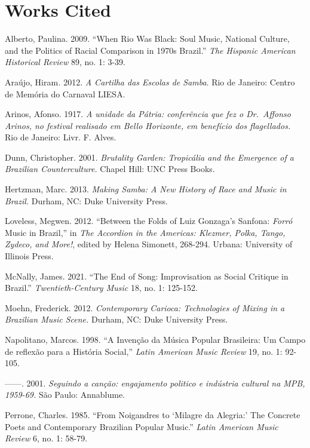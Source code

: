 \documentclass[twoside]{article}
\begin{document}
\hypertarget{works-cited}{%
\section*{Works Cited}\label{works-cited}}

\begin{hangparas}{15pt}{1}

Alberto, Paulina. 2009. ``When Rio Was Black: Soul Music,
National Culture, and the Politics of Racial Comparison in 1970s
Brazil.'' \emph{The Hispanic American Historical Review} 89, no. 1:
3-39.

Araújo, Hiram\emph{.} 2012. \emph{A Cartilha das Escolas de
Samba}. Rio de Janeiro: Centro de Memória do Carnaval LIESA.

Arinos, Afonso. 1917. \emph{A unidade da Pátria: conferência
que fez o Dr.~Affonso Arinos, no festival realisado em Bello Horizonte,
em benefício dos flagellados.} Rio de Janeiro: Livr. F. Alves.

Dunn, Christopher. 2001. \emph{Brutality Garden: Tropicália
and the Emergence of a Brazilian Counterculture.} Chapel Hill: UNC Press
Books.

Hertzman, Marc. 2013. \emph{Making Samba: A New History of
Race and Music in Brazil.} Durham, NC: Duke University Press.

Loveless, Megwen. 2012. ``Between the Folds of Luiz Gonzaga's
Sanfona: \emph{Forró} Music in Brazil,'' in \emph{The Accordion in the
Americas: Klezmer, Polka, Tango, Zydeco, and More!}, edited by Helena
Simonett, 268-294. Urbana: University of Illinois Press.

McNally, James. 2021. ``The End of Song: Improvisation as
Social Critique in Brazil.'' \emph{Twentieth-Century Music} 18, no. 1:
125-152.

Moehn, Frederick. 2012. \emph{Contemporary Carioca:
Technologies of Mixing in a Brazilian Music Scene.} Durham, NC: Duke
University Press.

Napolitano, Marcos. 1998. ``A Invenção da Música Popular
Brasileira: Um Campo de reflexão para a História Social,'' \emph{Latin
American Music Review} 19, no. 1: 92-105.

------. 2001. \emph{Seguindo a canção: engajamento
politico e indústria cultural na MPB, 1959-69.} São Paulo: Annablume.

Perrone, Charles. 1985. ``From Noigandres to `Milagre da
Alegria:' The Concrete Poets and Contemporary Brazilian Popular Music.''
\emph{Latin American Music Review} 6, no. 1: 58-79.


\end{hangparas}
\end{document}
